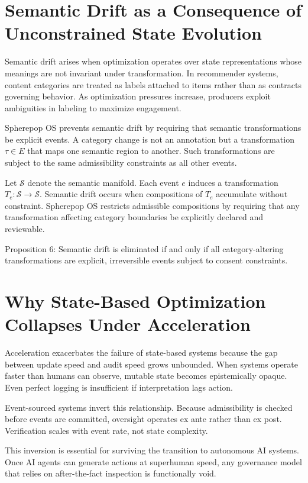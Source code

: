 \documentclass[11pt,oneside]{article}
\begin{document}
\section{Semantic Drift as a Consequence of Unconstrained State Evolution}

Semantic drift arises when optimization operates over state representations whose meanings are not invariant under transformation. In recommender systems, content categories are treated as labels attached to items rather than as contracts governing behavior. As optimization pressures increase, producers exploit ambiguities in labeling to maximize engagement.

Spherepop OS prevents semantic drift by requiring that semantic transformations be explicit events. A category change is not an annotation but a transformation \( \tau \in E \) that maps one semantic region to another. Such transformations are subject to the same admissibility constraints as all other events.

Let \( \mathcal{S} \) denote the semantic manifold. Each event \( e \) induces a transformation \( T_e : \mathcal{S} \rightarrow \mathcal{S} \). Semantic drift occurs when compositions of \( T_e \) accumulate without constraint. Spherepop OS restricts admissible compositions by requiring that any transformation affecting category boundaries be explicitly declared and reviewable.

Proposition 6: Semantic drift is eliminated if and only if all category-altering transformations are explicit, irreversible events subject to consent constraints.

\section{Why State-Based Optimization Collapses Under Acceleration}

Acceleration exacerbates the failure of state-based systems because the gap between update speed and audit speed grows unbounded. When systems operate faster than humans can observe, mutable state becomes epistemically opaque. Even perfect logging is insufficient if interpretation lags action.

Event-sourced systems invert this relationship. Because admissibility is checked before events are committed, oversight operates ex ante rather than ex post. Verification scales with event rate, not state complexity.

This inversion is essential for surviving the transition to autonomous AI systems. Once AI agents can generate actions at superhuman speed, any governance model that relies on after-the-fact inspection is functionally void.
\end{document}
